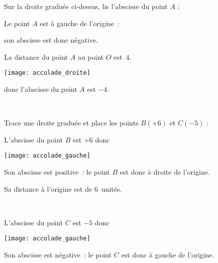 \vspace{2em}


\begin{methode*1}



\begin{exemple*1}
Sur la droite graduée ci-dessus, lis l'abscisse du point $A$ : \\[1em]
\begin{minipage}[c]{0.4\linewidth}
Le point $A$ est à gauche de l'origine :

son abscisse est donc négative.

La distance du point $A$ au point $O$ est $4$.
 \end{minipage} \hfill%
 \begin{minipage}[c]{0.1\linewidth}
 \begin{center}\texttt{[image: accolade\_droite]}\end{center}
  \end{minipage} \hfill%
  \begin{minipage}[c]{0.4\linewidth}
  donc l'abscisse du point $A$ est $-4$.
   \end{minipage} \\
\end{exemple*1}


\begin{exemple*1}
Trace une droite graduée et place les points $B(+6)$ et $C(-5)$ : \\[1em]
\begin{minipage}[c]{0.4\linewidth}
L'abscisse du point $B$ est $+6$ donc
 \end{minipage} \hfill%
 \begin{minipage}[c]{0.1\linewidth}
 \begin{center}\texttt{[image: accolade\_gauche]}\end{center}
  \end{minipage} \hfill%
  \begin{minipage}[c]{0.4\linewidth}
  Son abscisse est positive : le point $B$ est donc à droite de l'origine.
  
  Sa distance à l'origine est de 6 unités.
  \end{minipage} \\[0.5em]

\begin{minipage}[c]{0.4\linewidth}
L'abscisse du point $C$ est $-5$ donc
 \end{minipage} \hfill%
 \begin{minipage}[c]{0.1\linewidth}
 \begin{center}\texttt{[image: accolade\_gauche]}\end{center}
  \end{minipage} \hfill%
  \begin{minipage}[c]{0.4\linewidth}
  Son abscisse est négative : le point $C$ est donc à gauche de l'origine. 
  

\end{minipage}
\end{exemple*1}
\end{methode*1}
